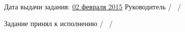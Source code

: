 {  \vspace{2em}

  \small{Дата выдачи задания: \uline{\hspace*{0.7em}02 февраля 2015\hspace*{0.7em}} \hspace{2ex} Руководитель \hfill{} \uline{\hspace*{6em}} / \diplomaTaskSupervisor~/}

  \vspace{1em}

  \small{Задание принял к исполнению \uline{\hspace*{7em}} / \diplomaTaskMe~/}

  \restoregeometry
}
